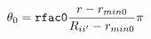 \documentclass[24pt]{article}
\begin{document}
\begin{eqnarray*}
\theta_0 = {\tt rfac0} \frac{r-r_{min0}}{R_{ii'}-r_{min0}} \pi
\end{eqnarray*}
\end{document}
